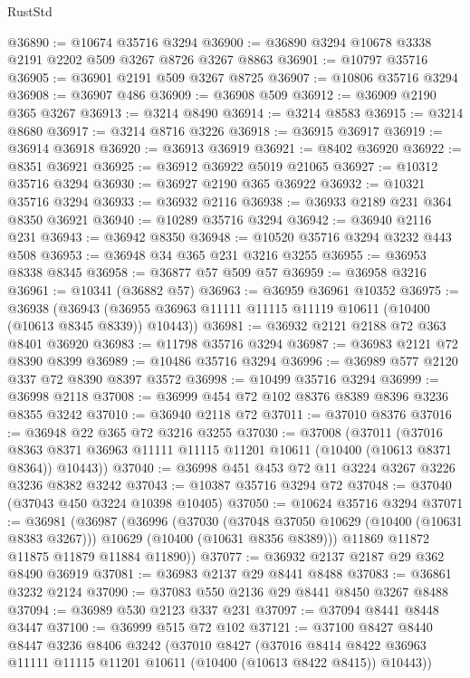 \begin{lexlean}{RustStd}
\begin{coremodule}
{\begin{coremodule}
{{{{{{{{{{{{{{{{{{{{{{{{{@36890 := @10674 @35716 @3294
@36900 := @36890 @3294 @10678 @3338 @2191 @2202 @509 @3267 @8726 @3267 @8863
@36901 := @10797 @35716
@36905 := @36901 @2191 @509 @3267 @8725
@36907 := @10806 @35716 @3294
@36908 := @36907 @486
@36909 := @36908 @509
@36912 := @36909 @2190 @365 @3267
@36913 := @3214 @8490
@36914 := @3214 @8583
@36915 := @3214 @8680
@36917 := @3214 @8716 @3226
@36918 := @36915 @36917
@36919 := @36914 @36918
@36920 := @36913 @36919
@36921 := @8402 @36920
@36922 := @8351 @36921
@36925 := @36912 @36922 @5019 @21065
@36927 := @10312 @35716 @3294
@36930 := @36927 @2190 @365 @36922
@36932 := @10321 @35716 @3294
@36933 := @36932 @2116
@36938 := @36933 @2189 @231 @364 @8350 @36921
@36940 := @10289 @35716 @3294
@36942 := @36940 @2116 @231
@36943 := @36942 @8350
@36948 := @10520 @35716 @3294 @3232 @443 @508
@36953 := @36948 @34 @365 @231 @3216 @3255
@36955 := @36953 @8338 @8345
@36958 := @36877 @57 @509 @57
@36959 := @36958 @3216
@36961 := @10341 (@36882 @57)
@36963 := @36959 @36961 @10352
@36975 := @36938
    (@36943 (@36955 @36963 @11111 @11115 @11119 @10611 (@10400 (@10613 @8345 @8339)) @10443))
@36981 := @36932 @2121 @2188 @72 @363 @8401 @36920
@36983 := @11798 @35716 @3294
@36987 := @36983 @2121 @72 @8390 @8399
@36989 := @10486 @35716 @3294
@36996 := @36989 @577 @2120 @337 @72 @8390 @8397 @3572
@36998 := @10499 @35716 @3294
@36999 := @36998 @2118
@37008 := @36999 @454 @72 @102 @8376 @8389 @8396 @3236 @8355 @3242
@37010 := @36940 @2118 @72
@37011 := @37010 @8376
@37016 := @36948 @22 @365 @72 @3216 @3255
@37030 := @37008
    (@37011
      (@37016 @8363 @8371 @36963 @11111 @11115 @11201 @10611 (@10400 (@10613 @8371 @8364)) @10443))
@37040 := @36998 @451 @453 @72 @11 @3224 @3267 @3226 @3236 @8382 @3242
@37043 := @10387 @35716 @3294 @72
@37048 := @37040 (@37043 @450 @3224 @10398 @10405)
@37050 := @10624 @35716 @3294
@37071 := @36981
    (@36987
      (@36996
        (@37030
          (@37048 @37050 @10629 (@10400 (@10631 @8383 @3267)))
          @10629
          (@10400 (@10631 @8356 @8389)))
        @11869
        @11872
        @11875
        @11879
        @11884
        @11890))
@37077 := @36932 @2137 @2187 @29 @362 @8490 @36919
@37081 := @36983 @2137 @29 @8441 @8488
@37083 := @36861 @3232 @2124
@37090 := @37083 @550 @2136 @29 @8441 @8450 @3267 @8488
@37094 := @36989 @530 @2123 @337 @231
@37097 := @37094 @8441 @8448 @3447
@37100 := @36999 @515 @72 @102
@37121 := @37100
    @8427
    @8440
    @8447
    @3236
    @8406
    @3242
    (@37010
      @8427
      (@37016 @8414 @8422 @36963 @11111 @11115 @11201 @10611 (@10400 (@10613 @8422 @8415)) @10443))
}}}}}}}}}}}}}}}}}}}}}}}}}
\end{coremodule}}
\end{coremodule}
\end{lexlean}
